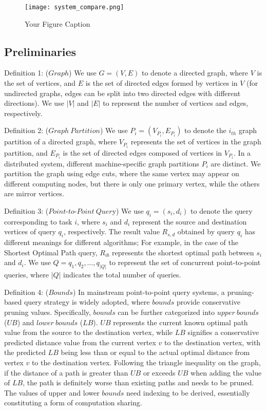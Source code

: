\documentclass[lettersize,journal]{IEEEtran} %
\begin{document}
\begin{figure}[t]
    \centering
    \texttt{[image: system\_compare.png]}
    \caption{Your Figure Caption}
    \label{fig:your_label}
  \end{figure}

\subsection{Preliminaries}
Definition 1: ($Graph$) We use $G=(V,E)$ to denote a directed graph, where $V$ is the set of vertices, and $E$ is the set of directed edges formed by vertices in $V$ (for undirected graphs, edges can be split into two directed edges with different directions). We use $|V|$ and $|E|$ to represent the number of vertices and edges, respectively.

Definition 2: ($Graph~Partition$) We use $P_i=(V_{P_i},E_{P_i})$ to denote the $i_{th}  $ graph partition of a directed graph, where $V_{P_i}$ represents the set of vertices in the graph partition, and $E_{P_i}$ is the set of directed edges composed of vertices in $V_{P_i}$. In a distributed system, different machine-specific graph partitions $P_i$ are distinct. We partition the graph using edge cuts, where the same vertex may appear on different computing nodes, but there is only one primary vertex, while the others are mirror vertices.

Definition 3: ($Point \text{-} to \text{-} Point~Quer$y) We use $q_i=(s_i,d_i)$ to denote the query corresponding to task $i$, where $s_i$ and $d_i$ represent the source and destination vertices of query $q_i$, respectively. The result value $R_{s,d}$ obtained by query $q_i$ has different meanings for different algorithms; For example, in the case of the Shortest Optimal Path query, $R_{ib}$ represents the shortest optimal path between $s_i$ and $d_i$. We use $Q={q_1,q_2,\ldots,q_{|Q|}}$ to represent the set of concurrent point-to-point queries, where $|Q|$ indicates the total number of queries.

Definition 4: ($Bounds$) In mainstream point-to-point query systems, a pruning-based query strategy is widely adopted, where $bounds$ provide conservative pruning values. Specifically, $bounds$ can be further categorized into $upper~bounds$ ($UB$) and $lower~bounds$ ($LB$). $UB$ represents the current known optimal path value from the source to the destination vertex, while $LB$ signifies a conservative predicted distance value from the current vertex $v$ to the destination vertex, with the predicted $LB$ being less than or equal to the actual optimal distance from vertex $v$ to the destination vertex. Following the triangle inequality on the graph, if the distance of a path is greater than $UB$ or exceeds $UB$ when adding the value of $LB$, the path is definitely worse than existing paths and needs to be pruned. The values of upper and lower $bounds$ need indexing to be derived, essentially constituting a form of computation sharing.
\end{document}
